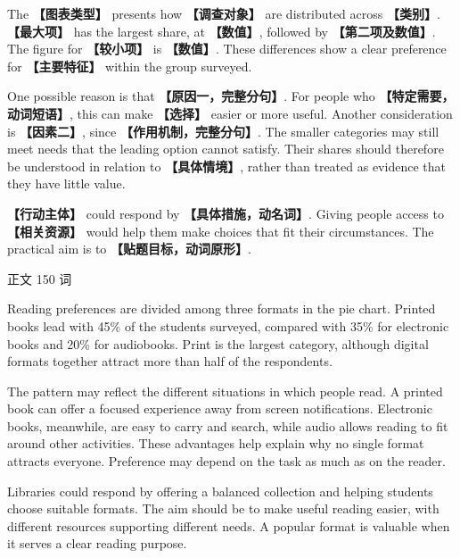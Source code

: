 \documentclass[11pt,a4paper,fontset=macnew]{ctexart}
\newenvironment{writing}{\begingroup\fontsize{10.5}{13.5}\selectfont\setlength{\parskip}{3pt}}{\par\endgroup}
\newenvironment{example}{\begingroup\fontsize{11}{14.3}\selectfont\setlength{\parskip}{4pt}}{\par\endgroup}
\begin{document}
\par\vspace{4pt}{\bfseries 可替换模板}\par\nopagebreak
\begin{writing}
The {\bfseries 【图表类型】} presents how {\bfseries 【调查对象】} are distributed across {\bfseries 【类别】}. {\bfseries 【最大项】} has the largest share, at {\bfseries 【数值】}, followed by {\bfseries 【第二项及数值】}. The figure for {\bfseries 【较小项】} is {\bfseries 【数值】}. These differences show a clear preference for {\bfseries 【主要特征】} within the group surveyed.

One possible reason is that {\bfseries 【原因一，完整分句】}. For people who {\bfseries 【特定需要，动词短语】}, this can make {\bfseries 【选择】} easier or more useful. Another consideration is {\bfseries 【因素二】}, since {\bfseries 【作用机制，完整分句】}. The smaller categories may still meet needs that the leading option cannot satisfy. Their shares should therefore be understood in relation to {\bfseries 【具体情境】}, rather than treated as evidence that they have little value.

{\bfseries 【行动主体】} could respond by {\bfseries 【具体措施，动名词】}. Giving people access to {\bfseries 【相关资源】} would help them make choices that fit their circumstances. The practical aim is to {\bfseries 【贴题目标，动词原形】}.

\end{writing}
\par\vspace{4pt}{\bfseries 完整套用示例}\par\nopagebreak
{\small 正文 150 词}\par
\begin{example}
Reading preferences are divided among three formats in the pie chart. Printed books lead with 45\% of the students surveyed, compared with 35\% for electronic books and 20\% for audiobooks. Print is the largest category, although digital formats together attract more than half of the respondents.

The pattern may reflect the different situations in which people read. A printed book can offer a focused experience away from screen notifications. Electronic books, meanwhile, are easy to carry and search, while audio allows reading to fit around other activities. These advantages help explain why no single format attracts everyone. Preference may depend on the task as much as on the reader.

Libraries could respond by offering a balanced collection and helping students choose suitable formats. The aim should be to make useful reading easier, with different resources supporting different needs. A popular format is valuable when it serves a clear reading purpose.

\end{example}
\end{document}
